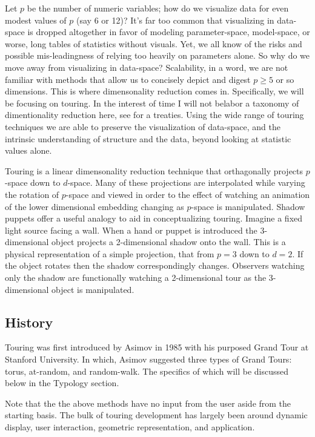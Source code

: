 \documentclass{monashthesis}
\begin{document}
Let \(p\) be the number of numeric variables; how do we visualize data
for even modest values of \(p\) (say 6 or 12)? It's far too common that
visualizing in data-space is dropped altogether in favor of modeling
parameter-space, model-space, or worse, long tables of statistics
without visuals\autocite{wickham_visualizing_2015}. Yet, we all know of
the risks and possible mis-leadingness of relying too heavily on
parameters alone\autocites{anscombe_graphs_1973}{matejka_same_2017}. So
why do we move away from visualizing in data-space? Scalability, in a
word, we are not familiar with methods that allow us to concisely depict
and digest \(p \geq 5\) or so dimensions. This is where dimensonality
reduction comes in. Specifically, we will be focusing on touring. In the
interest of time I will not belabor a taxonomy of dimentionality
reduction here, see \autocite[ REDU]{DIM} for a treaties. Using the wide
range of touring techniques we are able to preserve the visualization of
data-space, and the intrinsic understanding of structure and the data,
beyond looking at statistic values alone.

Touring is a linear dimensonality reduction technique that orthagonally
projects \(p\)-space down to \(d\)-space. Many of these projections are
interpolated while varying the rotation of \(p\)-space and viewed in
order to the effect of watching an animation of the lower dimensional
embedding changing as \(p\)-space is manipulated. Shadow puppets offer a
useful analogy to aid in conceptualizing touring. Imagine a fixed light
source facing a wall. When a hand or puppet is introduced the
3-dimensional object projects a 2-dimensional shadow onto the wall. This
is a physical representation of a simple projection, that from \(p=3\)
down to \(d=2\). If the object rotates then the shadow correspondingly
changes. Observers watching only the shadow are functionally watching a
2-dimensional tour as the 3-dimensional object is manipulated.

\subsection{History}\label{history}

Touring was first introduced by Asimov in 1985 with his purposed Grand
Tour\autocite{asimov_grand_1985} at Stanford University. In which,
Asimov suggested three types of Grand Tours: torus, at-random, and
random-walk. The specifics of which will be discussed below in the
Typology section.

Note that the the above methods have no input from the user aside from
the starting basis. The bulk of touring development has largely been
around dynamic display, user interaction, geometric representation, and
application.
\end{document}
